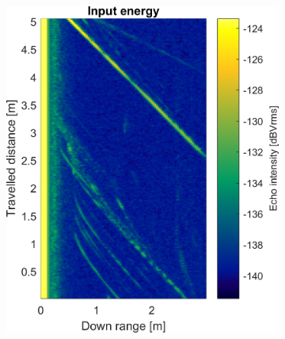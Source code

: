 \begin{figure}[htbp]
    \centering
    \begin{subfigure}[t]{0.475\linewidth}
        \centering
        \includegraphics[width=\linewidth,max height=.475\textheight]{gfx/results/cafeteria_input.png}
    \end{subfigure}%
    \hfill%
    \begin{subfigure}[t]{0.475\linewidth}
        \centering

\end{subfigure}
\end{figure}
